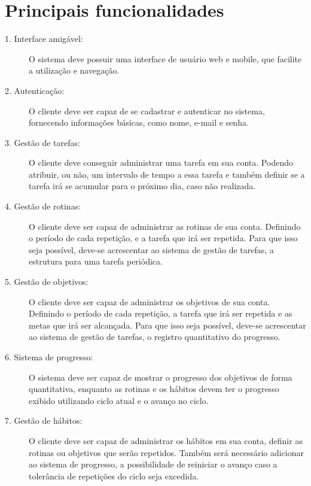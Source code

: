 \chapter{Principais funcionalidades}

\begin{description}

  \item[1. Interface amigável:] O sistema deve possuir uma interface de usuário web e
    mobile, que facilite a utilização e navegação.

  \item[2. Autenticação:] O cliente deve ser capaz de se cadastrar e autenticar no
    sistema, fornecendo informações básicas, como nome, e-mail e senha.

  \item[3. Gestão de tarefas:] O cliente deve conseguir administrar uma tarefa
    em sua conta. Podendo atribuir, ou não, um intervalo de tempo a essa tarefa e
    também definir se a tarefa irá se acumular para o próximo dia, caso não
    realizada.

  \item[4. Gestão de rotinas:] O cliente deve ser capaz de administrar as rotinas
    de sua conta. Definindo o período de cada repetição, e a tarefa que irá ser repetida.
    Para que isso seja possível, deve-se acrescentar ao sistema de gestão de tarefas,
    a estrutura para uma tarefa periódica.

  \item[5. Gestão de objetivos:] O cliente deve ser capaz de administrar os objetivos
    de sua conta. Definindo o período de cada repetição, a tarefa que irá ser repetida
    e as metas que irá ser alcançada. Para que isso seja possível, deve-se acrescentar
    ao sistema de gestão de tarefas, o registro quantitativo do progresso.

  \item[6. Sistema de progresso:] O sistema deve ser capaz de mostrar o progresso
    dos objetivos de forma quantitativa, enquanto as rotinas e os hábitos devem ter
    o progresso exibido utilizando ciclo atual e o avanço no ciclo.

  \item[7. Gestão de hábitos:] O cliente deve ser capaz de administrar os hábitos
    em sua conta, definir as rotinas ou objetivos que serão repetidos. Também será
    necessário adicionar ao sistema de progresso, a possibilidade de reiniciar o
    avanço caso a tolerância de repetições do ciclo seja excedida.


\end{description}
